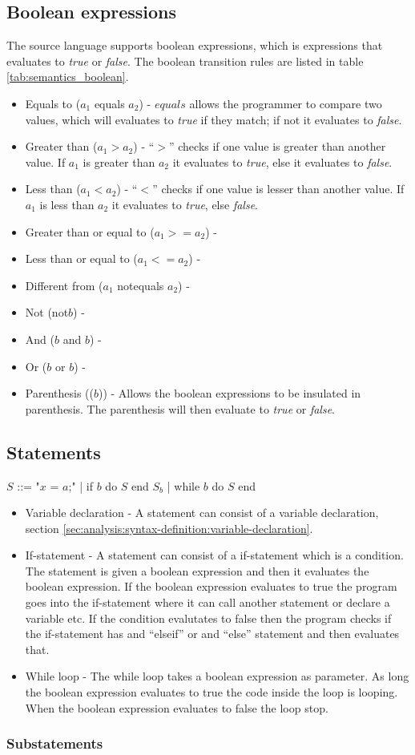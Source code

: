 \subsection{Boolean expressions}
The source language supports boolean expressions, which is expressions that evaluates to \textit{true} or \textit{false}. The boolean transition rules are listed in table \ref{tab:semantics_boolean}.
\begin{itemize}
	\item Equals to ($a_1$ equals $a_2$) - $equals$ allows the programmer to compare two values, which will evaluates to \textit{true} if they match; if not it evaluates to \textit{false}.
	\item Greater than ($a_1 > a_2$) - ``$>$'' checks if one value is greater than another value. If $a_1$ is greater than $a_2$ it evaluates to \textit{true}, else it evaluates to \textit{false}.
	\item Less than ($a_1 < a_2$) - ``$<$'' checks if one value is lesser than another value. If $a_1$ is less than $a_2$ it evaluates to \textit{true}, else \textit{false}.
	\item Greater than or equal to ($a_1 >= a_2$) - 
	\item Less than or equal to ($a_1 <= a_2$) - 
	\item Different from ($a_1$ notequals $a_2$) - 
	\item Not (not$b$) - 
	\item And ($b$ and $b$) -
	\item Or ($b$ or $b$) -
	\item Parenthesis (($b$)) - Allows the boolean expressions to be insulated in parenthesis. The parenthesis will then evaluate to \textit{true} or \textit{false}.
\end{itemize}
\subsection{Statements}

$S$ ::= "$x$ = $a$;" | if $b$ do $S$ end $S_b$ | while $b$ do $S$ end

\begin{itemize}
	\item Variable declaration - A statement can consist of a variable declaration, section \ref{sec:analysis:syntax-definition:variable-declaration}.
	\item If-statement - A statement can consist of a if-statement which is a condition. The statement is given a boolean expression and then it evaluates the boolean expression. If the boolean expression evaluates to true the program goes into the if-statement where it can call another statement or declare a variable etc. If the condition evalutates to false then the program checks if the if-statement has and ``elseif'' or and ``else'' statement and then evaluates that.
	\item While loop - The while loop takes a boolean expression as parameter. As long the boolean expression evaluates to true the code inside the loop is looping. When the boolean expression evaluates to false the loop stop.
\end{itemize}

\subsubsection{Substatements}

